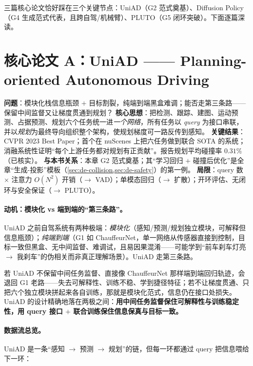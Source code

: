 三篇核心论文恰好踩在三个关键节点：UniAD（G2 范式奠基）、Diffusion Policy（G4 生成范式代表，且跨自驾/机械臂）、PLUTO（G5 闭环突破）。下面逐篇深读。

\section{核心论文 A：UniAD —— Planning-oriented Autonomous Driving}
\label{sec:de-uniad}

\begin{paper}\label{paper:de-uniad}
\textbf{问题}：模块化栈信息瓶颈 $+$ 目标割裂，纯端到端黑盒难调；能否走第三条路——保留中间监督又让梯度贯通到规划？
\textbf{核心思想}\cite{hu2023uniad}：把检测、跟踪、建图、运动预测、占据预测、规划六个任务统一进\emph{一个网络}，所有任务以 \emph{query} 为接口串联，并以\emph{规划}为最终导向组织整个架构，使规划梯度可一路反传到感知。
\textbf{关键结果}：CVPR 2023 Best Paper；首个在 nuScenes 上把六任务做到联合 SOTA 的系统；消融系统性证明“每个上游任务都对规划有正贡献”。报告规划平均碰撞率 $0.31\%$（已核实）。
\textbf{与本书关系}：本章 G2 范式奠基；其“学习回归 $+$ 碰撞后优化”是全章“生成-投影”模板（\cref{sec:de-collision,sec:de-safety}）的第一例。
\textbf{局限}：query 数 $\times$ 注意力 $O(N^2)$ 开销（$\to$ VAD）；单模态回归（$\to$ 扩散）；开环评估、无闭环与安全保证（$\to$ PLUTO）。
\end{paper}

\paragraph{动机：模块化 vs 端到端的“第三条路”。}
UniAD 之前自驾系统有两种极端：\emph{模块化}（感知/预测/规划独立模块，可解释但信息瓶颈）；\emph{纯端到端}（G1 如 ChauffeurNet，单一网络从传感器直接到控制，目标一致但黑盒、无中间监督、难调试，且易因果混淆——可能学到“前车刹车灯亮 $\to$ 我刹车”的伪相关而非真正理解场景）。UniAD 走第三条路。

\begin{insight}
若 UniAD 不保留中间任务监督、直接像 ChauffeurNet 那样端到端回归轨迹，会退回 G1 老路——失去可解释性、训练不稳、学到捷径特征；若不让梯度贯通、只把六个独立模块拼起来各自训练，那就是模块化范式，信息仍在接口处损失。UniAD 的设计精确地落在两极之间：\textbf{用中间任务监督保住可解释性与训练稳定性，用 query 接口 $+$ 联合训练保住信息保真与目标一致。}
\end{insight}

\paragraph{数据流总览。}
UniAD 是一条“感知 $\to$ 预测 $\to$ 规划”的链，但每一环都通过 query 把信息喂给下一环：

